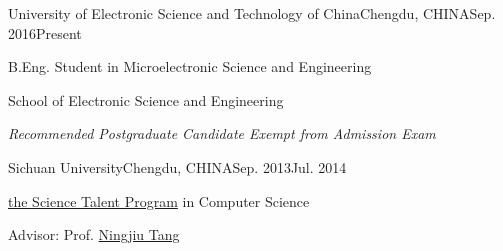 
\begin{eduitem}{University of Electronic Science and Technology of China}{Chengdu, CHINA}{Sep. 2016}{Present}
\item B.Eng. Student in Microelectronic Science and Engineering
\item School of Electronic Science and Engineering
\item {\emph{Recommended Postgraduate Candidate Exempt from Admission Exam}}
\end{eduitem}

\begin{eduitem}{Sichuan University}{Chengdu, CHINA}{Sep. 2013}{Jul. 2014}
\item \href{http://ycjh.org}{the Science Talent Program} in Computer Science 
\item Advisor: Prof. \href{http://cs.scu.edu.cn/info/1074/3930.htm}{Ningjiu Tang}
\end{eduitem}


\endinput